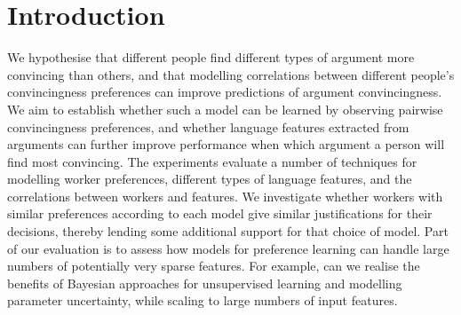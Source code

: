 \section{Introduction}\label{sec:intro}

We hypothesise that different people find different types of argument more convincing than others, and that modelling correlations between different people's convincingness preferences can improve predictions of argument convincingness. 
We aim to establish whether such a model can be learned by observing pairwise convincingness preferences, and whether language features extracted from arguments can further improve performance when which argument a person will find most convincing. 
The experiments evaluate a number of techniques for modelling worker preferences, different types of language features, and the correlations between workers and features. 
We investigate whether workers with similar preferences according to each model give similar justifications for their decisions, thereby lending some additional support for that choice of model.
Part of our evaluation is to assess how models for preference learning can handle large numbers of potentially very sparse features. For example, can we realise the benefits of Bayesian approaches for unsupervised learning and modelling parameter uncertainty, while scaling to large numbers of input features. 
